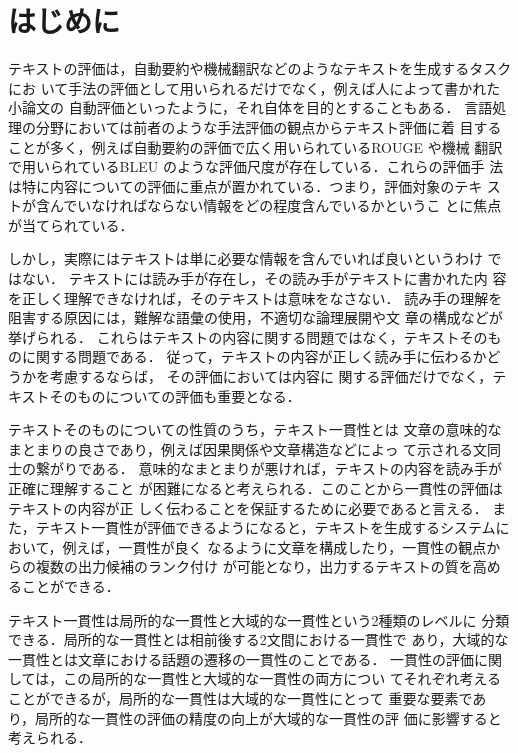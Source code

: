 \documentclass[japanese]{jnlp_1.4}
\begin{document}
\maketitle


 \section{はじめに}\label{introduction}
 テキストの評価は，自動要約や機械翻訳などのようなテキストを生成するタスクにお
 いて手法の評価として用いられるだけでなく，例えば人によって書かれた小論文の
 自動評価\cite{miltsakaki2004}といったように，それ自体を目的とすることもある．
 言語処理の分野においては前者のような手法評価の観点からテキスト評価に着
 目することが多く，例えば自動要約の評価で広く用いられているROUGE \cite{lin2003,lin2004}や機械
 翻訳で用いられているBLEU \cite{papineni2002}のような評価尺度が存在している．これらの評価手
 法は特に内容についての評価に重点が置かれている．つまり，評価対象のテキ
 ストが含んでいなければならない情報をどの程度含んでいるかというこ
 とに焦点が当てられている．

 しかし，実際にはテキストは単に必要な情報を含んでいれば良いというわけ
 ではない．
 テキストには読み手が存在し，その読み手がテキストに書かれた内
 容を正しく理解できなければ，そのテキストは意味をなさない．
 読み手の理解を阻害する原因には，難解な語彙の使用，不適切な論理展開や文
 章の構成などが挙げられる．
 これらはテキストの内容に関する問題ではなく，テキストそのものに関する問題である．
 従って，テキストの内容が正しく読み手に伝わるかどうかを考慮するならば，
 その評価においては内容に
 関する評価だけでなく，テキストそのものについての評価も重要となる．

 テキストそのものについての性質のうち，テキスト一貫性\cite{danwa}とは
 文章の意味的なまとまりの良さであり，例えば因果関係や文章構造などによっ
 て示される文同士の繋がりである．
 意味的なまとまりが悪ければ，テキストの内容を読み手が正確に理解すること
 が困難になると考えられる．このことから一貫性の評価はテキストの内容が正
 しく伝わることを保証するために必要であると言える．
 また，テキスト一貫性が評価できるようになると，テキストを生成するシステムにおいて，例えば，一貫性が良く
 なるように文章を構成したり，一貫性の観点からの複数の出力候補のランク付け
 が可能となり，出力するテキストの質を高めることができる．
 
 テキスト一貫性は局所的な一貫性と大域的な一貫性という2種類のレベルに
 分類できる．局所的な一貫性とは相前後する2文間における一貫性で
 あり，大域的な一貫性とは文章における話題の遷移の一貫性のことである．
 一貫性の評価に関しては，この局所的な一貫性と大域的な一貫性の両方につい
 てそれぞれ考えることができるが，局所的な一貫性は大域的な一貫性にとって
 重要な要素であり，局所的な一貫性の評価の精度の向上が大域的な一貫性の評
 価に影響すると考えられる．
 
\end{document}
